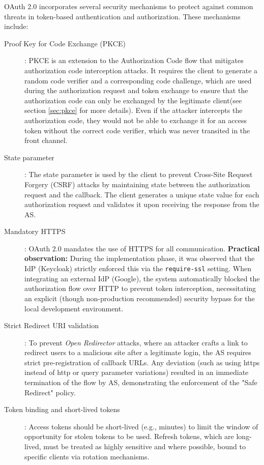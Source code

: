 \documentclass[../memoire.tex]{subfiles}
\begin{document}
OAuth 2.0 incorporates several security mechanisms to protect against common threats in token-based authentication and authorization. These mechanisms include:
\begin{description}
  \item[Proof Key for Code Exchange (PKCE)]: PKCE is an extension to the Authorization Code flow that mitigates authorization code interception attacks. It requires the client to generate a random code verifier and a corresponding code challenge, which are used during the authorization request and token exchange to ensure that the authorization code can only be exchanged by the legitimate client(see section \ref{sec:pkce} for more details). Even if the attacker intercepts the authorization code, they would not be able to exchange it for an access token without the correct code verifier, which was never transited in the front channel.
  \item[State parameter]: The state parameter is used by the client to prevent Cross-Site Request Forgery (CSRF) attacks by maintaining state between the authorization request and the callback\cite{rfc6749}. The client generates a unique state value for each authorization request and validates it upon receiving the response from the AS.
  \item[Mandatory HTTPS]: OAuth 2.0 mandates the use of HTTPS for all communication. \textbf{Practical observation:} During the implementation phase, it was observed that the IdP (Keycloak) strictly enforced this via the \texttt{require-ssl} setting. When integrating an external IdP (Google), the system automatically blocked the authorization flow over HTTP to prevent token interception, necessitating an explicit (though non-production recommended) security bypass for the local development environment. 
  \item[Strict Redirect URI validation]: To prevent \textit{Open Redirector} attacks, where an attacker crafts a link to redirect users to a malicious site after a legitimate login, the AS requires strict pre-registration of callback URLs. Any deviation (such as using https instead of http or query parameter variations) resulted in an immediate termination of the flow by AS, demonstrating the enforcement of the "Safe Redirect" policy.
  \item[Token binding and short-lived tokens]: Access tokens should be short-lived (e.g., minutes) to limit the window of opportunity for stolen tokens to be used. Refresh tokens, which are long-lived, must be treated as highly sensitive and where possible, bound to specific clients via rotation mechanisms\cite[section 10.4]{rfc6749}.
\end{description}
\end{document}
